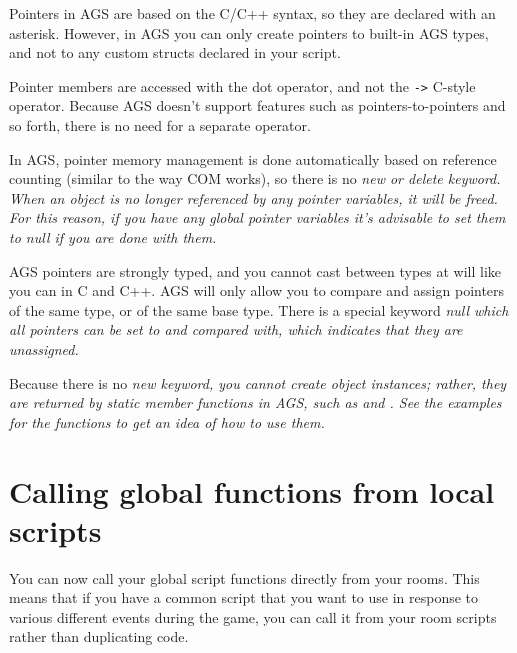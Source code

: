 Pointers in AGS are based on the C/C++ syntax, so they are declared with an asterisk.
However, in AGS you can only create pointers to built-in AGS types, and not to any
custom structs declared in your script.

Pointer members are accessed with the dot operator, and not the \verb$->$ C-style operator.
Because AGS doesn't support features such as pointers-to-pointers and so forth, there
is no need for a separate operator.

In AGS, pointer memory management is done automatically based on reference counting (similar
to the way COM works), so there is no \it{new} or \it{delete} keyword. When an object
is no longer referenced by any pointer variables, it will be freed. For this reason,
if you have any global pointer variables it's advisable to set them to \it{null} if
you are done with them.

AGS pointers are strongly typed, and you cannot cast between types at will like you
can in C and C++. AGS will only allow you to compare and assign pointers of the same
type, or of the same base type. There is a special keyword \it{null} which all pointers
can be set to and compared with, which indicates that they are unassigned.

Because there is no \it{new} keyword, you cannot create object instances; rather, they
are returned by static member functions in AGS, such as 
and . See the examples for the
functions to get an idea of how to use them.


\section{Calling global functions from local scripts}%

You can now call your global script functions directly from your rooms. This
means that if you have a common script that you want to use in response to
various different events during the game, you can call it from your room
scripts rather than duplicating code.

